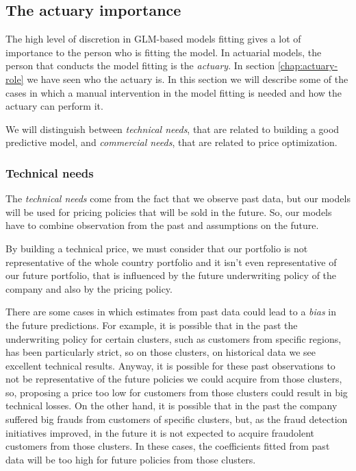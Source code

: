 \documentclass[a4paper, twoside, openright, 12pt]{report}
\theoremstyle{definition}
\theoremstyle{definition}
\theoremstyle{definition}
\theoremstyle{remark}
\begin{document}
\hypertarget{chap:actuary-importance}{%
\subsection{The actuary importance}\label{chap:actuary-importance}}

The high level of discretion in GLM-based models fitting gives a lot of importance to the person who is fitting the model. In actuarial models, the person that conducts the model fitting is the \emph{actuary}. In section \ref{chap:actuary-role} we have seen who the actuary is. In this section we will describe some of the cases in which a manual intervention in the model fitting is needed and how the actuary can perform it.

We will distinguish between \emph{technical needs}, that are related to building a good predictive model, and \emph{commercial needs}, that are related to price optimization.

\hypertarget{technical-needs}{%
\subsubsection{Technical needs}\label{technical-needs}}

The \emph{technical needs} come from the fact that we observe past data, but our models will be used for pricing policies that will be sold in the future. So, our models have to combine observation from the past and assumptions on the future.

By building a technical price, we must consider that our portfolio is not representative of the whole country portfolio and it isn't even representative of our future portfolio, that is influenced by the future underwriting policy of the company and also by the pricing policy.

There are some cases in which estimates from past data could lead to a \emph{bias} in the future predictions. For example, it is possible that in the past the underwriting policy for certain clusters, such as customers from specific regions, has been particularly strict, so on those clusters, on historical data we see excellent technical results. Anyway, it is possible for these past observations to not be representative of the future policies we could acquire from those clusters, so, proposing a price too low for customers from those clusters could result in big technical losses. On the other hand, it is possible that in the past the company suffered big frauds from customers of specific clusters, but, as the fraud detection initiatives improved, in the future it is not expected to acquire fraudolent customers from those clusters. In these cases, the coefficients fitted from past data will be too high for future policies from those clusters.
\end{document}
